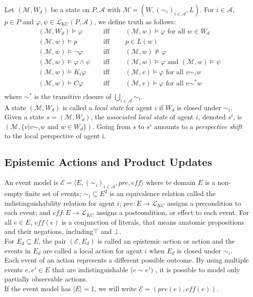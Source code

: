 Let $(\mathcal{M}, W_d)$ be a state on $P,\mathcal{A}$ with $\mathcal{M}=(W, (\sim_i)_{i \in \mathcal{A}}, L)$. For $i \in \mathcal{A}$, $p \in P$ and $\varphi, \psi \in \mathcal{L}_{\text{KC}}(P,\mathcal{A})$, we define truth as follows:
\begin{align*}
  &(\mathcal{M}, W_d) \models \varphi
    & &\text{ iff } \qquad
    (\mathcal{M},w)\models \varphi \text{ for all } w \in W_d \\
  &(\mathcal{M}, w) \models p
    & &\text{ iff } \qquad
    p \in L(w) \\
  &(\mathcal{M}, w) \models \neg \varphi
    & &\text{ iff } \qquad
    (\mathcal{M},w) \not\models \varphi \\
  &(\mathcal{M}, w) \models \varphi \wedge \psi
    & &\text{ iff } \qquad
    (\mathcal{M},w) \models \varphi \text{ and } (\mathcal{M},w) \models \psi \\
  &(\mathcal{M}, w) \models K_i \varphi
    & &\text{ iff } \qquad
    (\mathcal{M},v) \models \varphi \text{ for all } v \sim_i w \\
  &(\mathcal{M}, w) \models C \varphi
    & &\text{ iff } \qquad
    (\mathcal{M},v) \models \varphi \text{ for all } v \sim^* w \\
\end{align*}
where $\sim^*$ is the transitive closure of $\bigcup_{i \in \mathcal{A}}\sim_i$. \\
A state $(\mathcal{M}, W_d)$ is called a \textit{local state} for agent $i$ if $W_d$ is closed under $\sim_i$. Given a state $s=(\mathcal{M}, W_d)$, the \textit{associated local state} of agent $i$, denoted $s^i$, is $(\mathcal{M}, \{v|v\sim_i w \text{ and } w \in W_d\})$. Going from $s$ to $s^i$ amounts to a \textit{perspective shift} to the local perspective of agent i.

\subsection{Epistemic Actions and Product Updates}

An event model is $\mathcal{E} = \langle E, (\sim_i)_{i\in \mathcal{A}}, pre, \textit{eff}  \rangle$ where te domain $E$ is a non-empty finite set of events; $\sim_i \subseteq E^2$ is an equivalence relation called the indistinguishability relation for agent $i$;
$pre:E \rightarrow \mathcal{L}_{KC}$ assigns a precondition to each event;
and $\textit{eff}:E \rightarrow \mathcal{L}_{KC}$ assigns a postcondition, or effect to each event.
For all $e\in E$, $\textit{eff}(e)$ is a conjunction of literals, that means anatomic propositions and their negations, including$\top$ and $\bot$.\\
For $E_d \subseteq E$, the pair $(\mathcal{E}, E_d)$ is called an epistemic action or action and the events in $E_d$ are called a local action for agent $i$ when $E_d$ is closed under $\sim_i$. \\
Each event of an action represents a different possible outcome.
By using multiple events $e, e' \in E$ that are indistinguishable ($e \sim e' )$ , it is possible to model only partially observable actions.\\
If the event model has $|E|=1$, we will write $\mathcal{E}=(pre(e), \textit{eff}(e))$.

